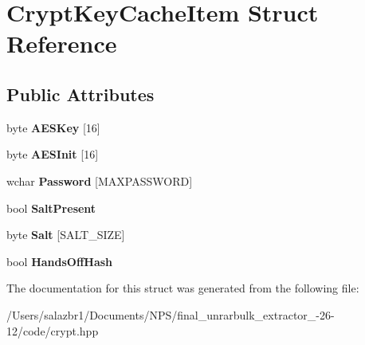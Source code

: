 \hypertarget{struct_crypt_key_cache_item}{\section{Crypt\-Key\-Cache\-Item Struct Reference}
\label{struct_crypt_key_cache_item}
}
\subsection*{Public Attributes}
\begin{DoxyCompactItemize}
\item 
\hypertarget{struct_crypt_key_cache_item_a766794c91064e89b1ce20749ad577392}{byte {\bfseries A\-E\-S\-Key} \mbox{[}16\mbox{]}}\label{struct_crypt_key_cache_item_a766794c91064e89b1ce20749ad577392}

\item 
\hypertarget{struct_crypt_key_cache_item_a91843c1ca6dbee6fbaed31d2edeaf9f7}{byte {\bfseries A\-E\-S\-Init} \mbox{[}16\mbox{]}}\label{struct_crypt_key_cache_item_a91843c1ca6dbee6fbaed31d2edeaf9f7}

\item 
\hypertarget{struct_crypt_key_cache_item_a71d480efb1c3c0258fe97e659c57edd8}{wchar {\bfseries Password} \mbox{[}M\-A\-X\-P\-A\-S\-S\-W\-O\-R\-D\mbox{]}}\label{struct_crypt_key_cache_item_a71d480efb1c3c0258fe97e659c57edd8}

\item 
\hypertarget{struct_crypt_key_cache_item_a959682f1e006bbfadf6dc1f8d628ef6a}{bool {\bfseries Salt\-Present}}\label{struct_crypt_key_cache_item_a959682f1e006bbfadf6dc1f8d628ef6a}

\item 
\hypertarget{struct_crypt_key_cache_item_adfbaf4a6733f70f4e6add54e40d85a3a}{byte {\bfseries Salt} \mbox{[}S\-A\-L\-T\-\_\-\-S\-I\-Z\-E\mbox{]}}\label{struct_crypt_key_cache_item_adfbaf4a6733f70f4e6add54e40d85a3a}

\item 
\hypertarget{struct_crypt_key_cache_item_a4f99eebd37130aba807b69a014f0abf9}{bool {\bfseries Hands\-Off\-Hash}}\label{struct_crypt_key_cache_item_a4f99eebd37130aba807b69a014f0abf9}

\end{DoxyCompactItemize}


The documentation for this struct was generated from the following file\-:\begin{DoxyCompactItemize}
\item 
/\-Users/salazbr1/\-Documents/\-N\-P\-S/final\-\_\-unrarbulk\-\_\-extractor\-\_-\/26-\/12/code/crypt.\-hpp\end{DoxyCompactItemize}

